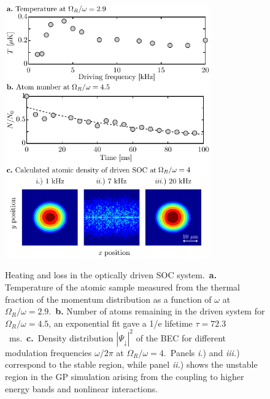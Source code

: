 \documentclass[twocolumn,amsmath,amssymb,floatfix,prl]{revtex4-1}
\begin{document}
\begin{figure}
 \begin{center}
 \includegraphics[width=3.5in]{epsfiles/Figure4.pdf}\\
 \end{center}
 \vspace{-0pt}
 \caption[Heating.]{Heating and loss in the optically driven SOC system.~{\bf a.} Temperature of the atomic sample measured from the thermal fraction of the momentum distribution as a function of $\omega$ at ${\Omega_R/\omega=2.9}$.~{\bf b.} Number of atoms remaining in the driven system for ${\Omega_R/\omega=4.5}$, an exponential fit gave a 1/e lifetime $\tau = 72.3$~{ms}.~{\bf c.}~Density distribution $\left\vert \Psi _{\downarrow }\right\vert^{2} $ of the BEC for different modulation frequencies $\omega/2\pi$ at ${\Omega_R/\omega=4}$.~Panels {\it i.}) and {\it iii.}) correspond to the stable region, while panel {\it ii.}) shows the unstable region in the GP simulation arising from the coupling to higher energy bands and nonlinear interactions.}
 \label{fig:Heating}
\end{figure}
\end{document}
